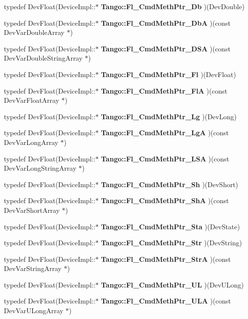\begin{DoxyCompactItemize}
\item 
typedef Dev\-Float(Device\-Impl\-::$\ast$ {\bf Tango\-::\-Fl\-\_\-\-Cmd\-Meth\-Ptr\-\_\-\-Db} )(Dev\-Double)
\item 
typedef Dev\-Float(Device\-Impl\-::$\ast$ {\bf Tango\-::\-Fl\-\_\-\-Cmd\-Meth\-Ptr\-\_\-\-Db\-A} )(const Dev\-Var\-Double\-Array $\ast$)
\item 
typedef Dev\-Float(Device\-Impl\-::$\ast$ {\bf Tango\-::\-Fl\-\_\-\-Cmd\-Meth\-Ptr\-\_\-\-D\-S\-A} )(const Dev\-Var\-Double\-String\-Array $\ast$)
\item 
typedef Dev\-Float(Device\-Impl\-::$\ast$ {\bf Tango\-::\-Fl\-\_\-\-Cmd\-Meth\-Ptr\-\_\-\-Fl} )(Dev\-Float)
\item 
typedef Dev\-Float(Device\-Impl\-::$\ast$ {\bf Tango\-::\-Fl\-\_\-\-Cmd\-Meth\-Ptr\-\_\-\-Fl\-A} )(const Dev\-Var\-Float\-Array $\ast$)
\item 
typedef Dev\-Float(Device\-Impl\-::$\ast$ {\bf Tango\-::\-Fl\-\_\-\-Cmd\-Meth\-Ptr\-\_\-\-Lg} )(Dev\-Long)
\item 
typedef Dev\-Float(Device\-Impl\-::$\ast$ {\bf Tango\-::\-Fl\-\_\-\-Cmd\-Meth\-Ptr\-\_\-\-Lg\-A} )(const Dev\-Var\-Long\-Array $\ast$)
\item 
typedef Dev\-Float(Device\-Impl\-::$\ast$ {\bf Tango\-::\-Fl\-\_\-\-Cmd\-Meth\-Ptr\-\_\-\-L\-S\-A} )(const Dev\-Var\-Long\-String\-Array $\ast$)
\item 
typedef Dev\-Float(Device\-Impl\-::$\ast$ {\bf Tango\-::\-Fl\-\_\-\-Cmd\-Meth\-Ptr\-\_\-\-Sh} )(Dev\-Short)
\item 
typedef Dev\-Float(Device\-Impl\-::$\ast$ {\bf Tango\-::\-Fl\-\_\-\-Cmd\-Meth\-Ptr\-\_\-\-Sh\-A} )(const Dev\-Var\-Short\-Array $\ast$)
\item 
typedef Dev\-Float(Device\-Impl\-::$\ast$ {\bf Tango\-::\-Fl\-\_\-\-Cmd\-Meth\-Ptr\-\_\-\-Sta} )(Dev\-State)
\item 
typedef Dev\-Float(Device\-Impl\-::$\ast$ {\bf Tango\-::\-Fl\-\_\-\-Cmd\-Meth\-Ptr\-\_\-\-Str} )(Dev\-String)
\item 
typedef Dev\-Float(Device\-Impl\-::$\ast$ {\bf Tango\-::\-Fl\-\_\-\-Cmd\-Meth\-Ptr\-\_\-\-Str\-A} )(const Dev\-Var\-String\-Array $\ast$)
\item 
typedef Dev\-Float(Device\-Impl\-::$\ast$ {\bf Tango\-::\-Fl\-\_\-\-Cmd\-Meth\-Ptr\-\_\-\-U\-L} )(Dev\-U\-Long)
\item 
typedef Dev\-Float(Device\-Impl\-::$\ast$ {\bf Tango\-::\-Fl\-\_\-\-Cmd\-Meth\-Ptr\-\_\-\-U\-L\-A} )(const Dev\-Var\-U\-Long\-Array $\ast$)
\item 

\end{DoxyCompactItemize}
